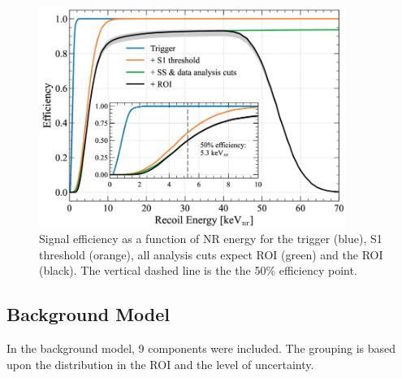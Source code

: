 \begin{figure}
    \centering
    \includegraphics[width=10cm]{Figures/EFT/All_SR1_Plots/NR_efficiency.png}
    \caption{Signal efficiency as a function of NR energy for the trigger (blue), S1 threshold (orange), all analysis cuts expect ROI (green) and the ROI (black).
    The vertical dashed line is the the 50\% efficiency point.
    }
    \label{fig:sr1_nr_efficiency}
\end{figure}




\subsection{Background Model}
\par
In the background model, 9 components were included.
The grouping is based upon the distribution in the ROI and the level of uncertainty.


